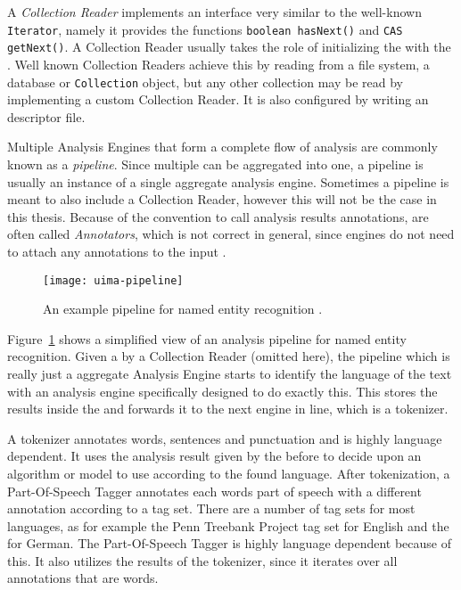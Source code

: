 A \emph{Collection Reader} implements an interface very similar to the well-known \lstinline|Iterator|, namely it provides the functions \lstinline|boolean hasNext()| and \lstinline|CAS getNext()|. A Collection Reader usually takes the role of initializing the \cas{} with the \sofa{}. Well known Collection Readers achieve this by reading from a file system, a database or \lstinline|Collection| object, but any other collection may be read by implementing a custom Collection Reader. It is also configured by writing an \xml{} descriptor file.

Multiple Analysis Engines that form a complete flow of analysis are commonly known as a \emph{pipeline}. Since multiple \anens{} can be aggregated into one, a pipeline is usually an instance of a single aggregate analysis engine. Sometimes a pipeline is meant to also include a Collection Reader, however this will not be the case in this thesis. Because of the convention to call analysis results annotations, \anens{} are often called \emph{Annotators}, which is not correct in general, since engines do not need to attach any annotations to the input \cas{}.

\begin{figure}[hbt]
	\centering
	\texttt{[image: uima-pipeline]}
	\caption[An example UIMA pipeline for NER.]{An example \uima{} pipeline for named entity recognition \cite{uimasdk}.}
	\label{fig:uimaner}
\end{figure}

Figure~\ref{fig:uimaner} shows a simplified view of an analysis pipeline for named entity recognition. Given a \cas{} by a Collection Reader (omitted here), the pipeline which is really just a aggregate Analysis Engine starts to identify the language of the text with an analysis engine specifically designed to do exactly this. This \anen{} stores the results inside the \cas{} and forwards it to the next engine in line, which is a tokenizer. 

A tokenizer annotates words, sentences and punctuation and is highly language dependent. It uses the analysis result given by the \anen{} before to decide upon an algorithm or model to use according to the found language. After tokenization, a Part-Of-Speech Tagger annotates each words part of speech with a different annotation according to a tag set. There are a number of tag sets for most languages, as for example the Penn Treebank Project tag set for English and the \stts{} for German. The Part-Of-Speech Tagger is highly language dependent because of this. It also utilizes the results of the tokenizer, since it iterates over all annotations that are words.

